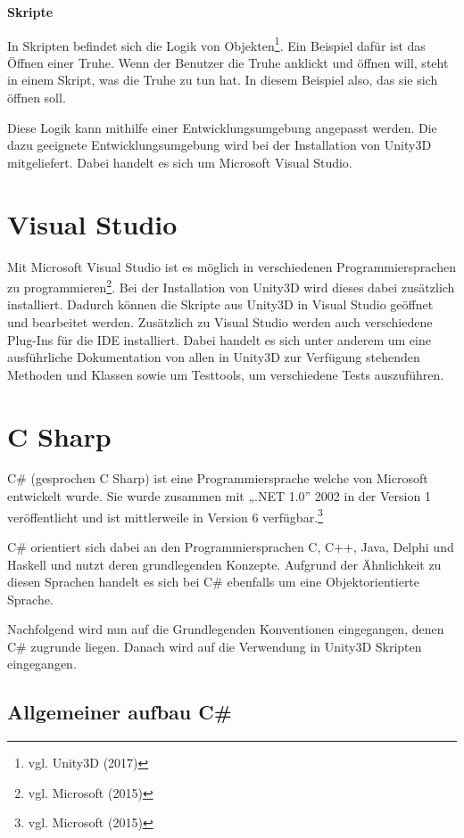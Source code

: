 \textbf{Skripte}

In Skripten befindet sich die Logik von Objekten\footnote{vgl. Unity3D \cite{unity8} (2017)}. Ein Beispiel dafür ist das Öffnen einer Truhe. Wenn der Benutzer die Truhe anklickt und öffnen will, steht in einem Skript, was die Truhe zu tun hat. In diesem Beispiel also, das sie sich öffnen soll. 

Diese Logik kann mithilfe einer Entwicklungsumgebung angepasst werden. Die dazu geeignete Entwicklungsumgebung wird bei der Installation von Unity3D mitgeliefert. Dabei handelt es sich um Microsoft Visual Studio.

\section{Visual Studio}

Mit Microsoft Visual Studio ist es möglich in verschiedenen Programmiersprachen zu programmieren\footnote{vgl. Microsoft \cite{microsoft1} (2015)}.
Bei der Installation von Unity3D wird dieses dabei zusätzlich installiert. Dadurch können die Skripte aus Unity3D in Visual Studio geöffnet und bearbeitet werden. Zusätzlich zu Visual Studio werden auch verschiedene Plug-Ins für die IDE installiert. Dabei handelt es sich unter anderem um eine ausführliche Dokumentation von allen in Unity3D zur Verfügung stehenden Methoden und Klassen sowie um Testtools, um verschiedene Tests auszuführen. 

\section{C Sharp}

C\# (gesprochen C Sharp) ist eine Programmiersprache welche von Microsoft entwickelt wurde. Sie wurde zusammen mit „.NET 1.0” 2002 in der Version 1 veröffentlicht und ist mittlerweile in Version 6 verfügbar.\footnote{vgl. Microsoft \cite{microsoft2} (2015)} 

C\# orientiert sich dabei an den Programmiersprachen C, C++, Java, Delphi und Haskell und nutzt deren grundlegenden Konzepte. Aufgrund der Ähnlichkeit zu diesen Sprachen handelt es sich bei C\# ebenfalls um eine Objektorientierte Sprache. 

Nachfolgend wird nun auf die Grundlegenden Konventionen eingegangen, denen C\# zugrunde liegen. Danach wird auf die Verwendung in Unity3D Skripten eingegangen.

\subsection{Allgemeiner aufbau C\#}

